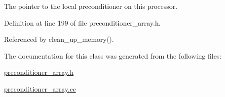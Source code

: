 The pointer to the local preconditioner on this processor. 



Definition at line 199 of file preconditioner\+\_\+array.\+h.



Referenced by clean\+\_\+up\+\_\+memory().



The documentation for this class was generated from the following files\+:\begin{DoxyCompactItemize}
\item 
\hyperlink{preconditioner__array_8h}{preconditioner\+\_\+array.\+h}\item 
\hyperlink{preconditioner__array_8cc}{preconditioner\+\_\+array.\+cc}\end{DoxyCompactItemize}
